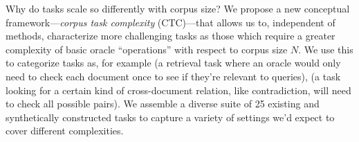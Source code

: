 


Why do tasks scale so differently with corpus size? We propose a new conceptual framework---\emph{corpus task complexity} (CTC)---that allows us to, independent of methods, characterize more challenging tasks as those which require a greater complexity of basic oracle ``operations'' with respect to corpus size $N$. We use this to categorize tasks as, for example  (a retrieval task where an oracle would only need to check each document once to see if they're relevant to queries),  (a task looking for a certain kind of cross-document relation, like contradiction, will need to check all possible pairs).  We assemble a diverse suite of 25 existing and synthetically constructed tasks to capture a variety of settings we'd expect to cover different complexities. %

